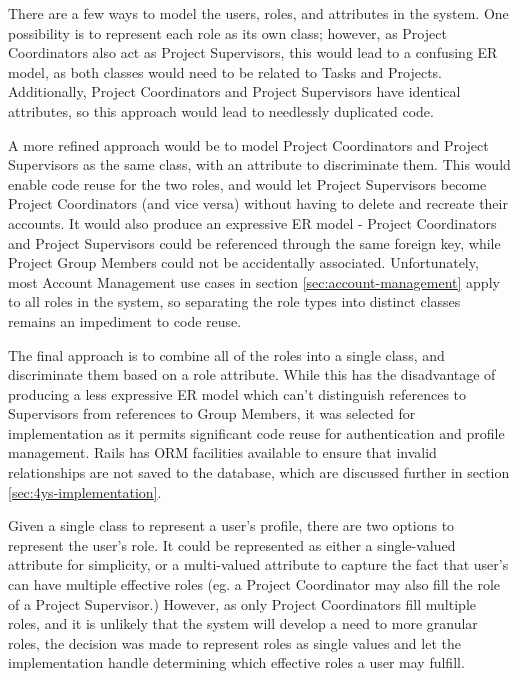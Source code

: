 There are a few ways to model the users, roles, and attributes in the system. One possibility is to represent each role as its own class; however, as Project Coordinators also act as Project Supervisors, this would lead to a confusing ER model, as both classes would need to be related to Tasks and Projects. Additionally, Project Coordinators and Project Supervisors have identical attributes, so this approach would lead to needlessly duplicated code.

A more refined approach would be to model Project Coordinators and Project Supervisors as the same class, with an attribute to discriminate them. This would enable code reuse for the two roles, and would let Project Supervisors become Project Coordinators (and vice versa) without having to delete and recreate their accounts. It would also produce an expressive ER model - Project Coordinators and Project Supervisors could be referenced through the same foreign key, while Project Group Members could not be accidentally associated. Unfortunately, most Account Management use cases in section \ref{sec:account-management} apply to all roles in the system, so separating the role types into distinct classes remains an impediment to code reuse.

The final approach is to combine all of the roles into a single class, and discriminate them based on a role attribute. While this has the disadvantage of producing a less expressive ER model which can’t distinguish references to Supervisors from references to Group Members, it was selected for implementation as it permits significant code reuse for authentication and profile management. Rails has ORM facilities available to ensure that invalid relationships are not saved to the database, which are discussed further in section \ref{sec:4ys-implementation}.

Given a single class to represent a user’s profile, there are two options to represent the user’s role. It could be represented as either a single-valued attribute for simplicity, or a multi-valued attribute to capture the fact that user’s can have multiple effective roles (eg. a Project Coordinator may also fill the role of a Project Supervisor.) However, as only Project Coordinators fill multiple roles, and it is unlikely that the system will develop a need to more granular roles, the decision was made to represent roles as single values and let the implementation handle determining which effective roles a user may fulfill.


\FloatBarrier

